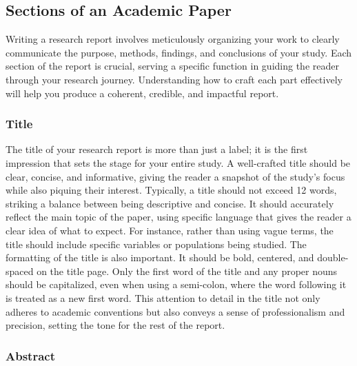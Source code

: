 \documentclass[
]{book}
\begin{document}
\subsection*{Sections of an Academic Paper}\label{sections-of-an-academic-paper}

Writing a research report involves meticulously organizing your work to clearly communicate the purpose, methods, findings, and conclusions of your study. Each section of the report is crucial, serving a specific function in guiding the reader through your research journey. Understanding how to craft each part effectively will help you produce a coherent, credible, and impactful report.

\subsubsection*{Title}\label{title}

The title of your research report is more than just a label; it is the first impression that sets the stage for your entire study. A well-crafted title should be clear, concise, and informative, giving the reader a snapshot of the study's focus while also piquing their interest. Typically, a title should not exceed 12 words, striking a balance between being descriptive and concise. It should accurately reflect the main topic of the paper, using specific language that gives the reader a clear idea of what to expect. For instance, rather than using vague terms, the title should include specific variables or populations being studied. The formatting of the title is also important. It should be bold, centered, and double-spaced on the title page. Only the first word of the title and any proper nouns should be capitalized, even when using a semi-colon, where the word following it is treated as a new first word. This attention to detail in the title not only adheres to academic conventions but also conveys a sense of professionalism and precision, setting the tone for the rest of the report.

\subsubsection*{Abstract}\label{abstract}
\end{document}
